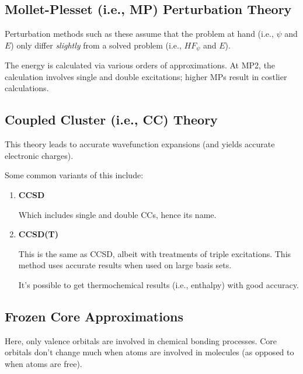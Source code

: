 \documentclass[
  letterpaper,
  DIV=11,
  numbers=noendperiod]{scrreprt}
\begin{document}
\hypertarget{mollet-plesset-i.e.-mp-perturbation-theory}{%
\subsection{Mollet-Plesset (i.e., MP) Perturbation
Theory}\label{mollet-plesset-i.e.-mp-perturbation-theory}}

Perturbation methods such as these assume that the problem at hand
(i.e., \(\psi\) and \(E\)) only differ \emph{slightly} from a solved
problem (i.e., \(HF_{\psi}\) and \(E\)).

The energy is calculated via various orders of approximations. At MP2,
the calculation involves single and double excitations; higher MPs
result in costlier calculations.

\hypertarget{coupled-cluster-i.e.-cc-theory}{%
\subsection{Coupled Cluster (i.e., CC)
Theory}\label{coupled-cluster-i.e.-cc-theory}}

This theory leads to accurate wavefunction expansions (and yields
accurate electronic charges).

Some common variants of this include:

\begin{enumerate}
\def\labelenumi{\arabic{enumi}.}
\item
  \textbf{CCSD}

  Which includes single and double CCs, hence its name.
\item
  \textbf{CCSD(T)}

  This is the same as CCSD, albeit with treatments of triple
  excitations. This method uses accurate results when used on large
  basis sets.

  It's possible to get thermochemical results (i.e., enthalpy) with good
  accuracy.
\end{enumerate}

\hypertarget{frozen-core-approximations}{%
\subsection{Frozen Core
Approximations}\label{frozen-core-approximations}}

Here, only valence orbitals are involved in chemical bonding processes.
Core orbitals don't change much when atoms are involved in molecules (as
opposed to when atoms are free).
\end{document}

